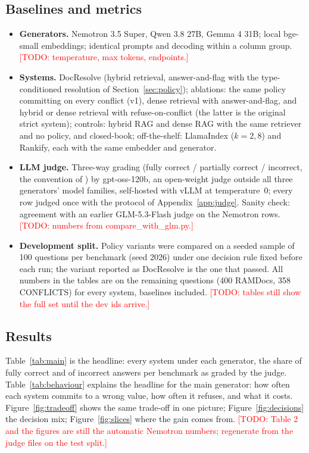 \documentclass[11pt]{article}
\newcommand{\sysname}{DocResolve}   %
\newcommand{\todo}[1]{\textcolor{red}{[TODO: #1]}}
\newcommand{\genA}{Nemotron 3.5 Super}
\newcommand{\genB}{Qwen 3.8 27B}
\newcommand{\genC}{Gemma 4 31B}
\begin{document}
\subsection{Baselines and metrics}
\begin{itemize}
  \item \textbf{Generators.} \genA, \genB, \genC; local bge-small embeddings;
        identical prompts and decoding within a column group. \todo{temperature,
        max tokens, endpoints.}
  \item \textbf{Systems.} \sysname{} (hybrid retrieval, answer-and-flag with
        the type-conditioned resolution of Section~\ref{sec:policy});
        ablations: the same policy committing on every conflict (v1), dense
        retrieval with answer-and-flag, and hybrid or dense retrieval with
        refuse-on-conflict (the latter is the original strict system);
        controls: hybrid RAG and dense RAG with the same retriever and no
        policy, and closed-book; off-the-shelf: LlamaIndex ($k{=}2,8$) and
        Rankify, each with the same embedder and generator.
  \item \textbf{LLM judge.} Three-way grading (fully correct / partially
        correct / incorrect, the convention of \citealp{kumar-etal-2026-sentryline})
        by gpt-oss-120b, an open-weight judge outside all three generators'
        model families, self-hosted with vLLM at temperature~0; every row
        judged once with the protocol of Appendix~\ref{app:judge}. Sanity
        check: agreement with an earlier GLM-5.3-Flash judge on the Nemotron
        rows. \todo{numbers from compare\_with\_glm.py.}
  \item \textbf{Development split.} Policy variants were compared on a seeded
        sample of 100 questions per benchmark (seed 2026) under one decision
        rule fixed before each run; the variant reported as \sysname{} is the
        one that passed. All numbers in the tables are on the remaining
        questions (400 RAMDocs, 358 CONFLICTS) for every system, baselines
        included. \todo{tables still show the full set until the dev ids
        arrive.}
\end{itemize}

\subsection{Results}
Table~\ref{tab:main} is the headline: every system under each generator,
the share of fully correct and of incorrect answers per benchmark as graded
by the judge. Table~\ref{tab:behaviour} explains the headline for the main
generator: how often each system commits to a wrong value, how often it
refuses, and what it costs. Figure~\ref{fig:tradeoff} shows the same
trade-off in one picture; Figure~\ref{fig:decisions} the decision mix;
Figure~\ref{fig:slices} where the gain comes from. \todo{Table 2 and the
figures are still the automatic Nemotron numbers; regenerate from the judge
files on the test split.}
\end{document}
